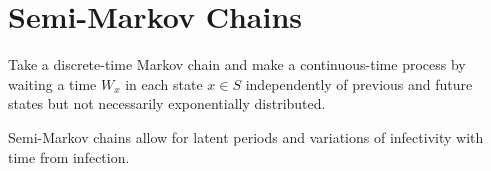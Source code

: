 \section{Semi-Markov Chains}

\begin{definition}
    Take a discrete-time Markov chain and make a continuous-time process by waiting a time $W_x$ in each state $x \in S$ independently of previous and future states but not necessarily exponentially distributed.
\end{definition}

\begin{remark}
    Semi-Markov chains allow for latent periods and variations of infectivity with time from infection.
\end{remark}